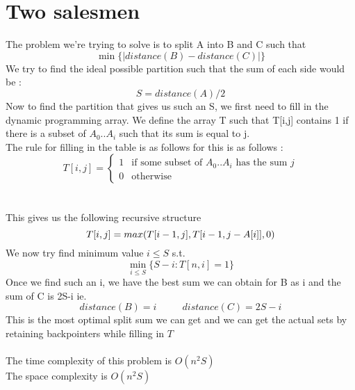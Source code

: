 \documentclass{article}
\begin{document}
    

\section{Two salesmen}
\label{sec:Two salesmen}
    The problem we're trying to solve is to split A into B and C such that
    \[\min \{|distance(B) - distance(C)|\}\]
    We try to find the ideal possible partition such that the sum of each side would be :
    \[S = distance(A)/2\]
    Now to find the partition that gives us such an S, we first need to fill in the dynamic programming array. We define the array T such that T[i,j] contains 1 if there is a subset of $A_0 .. A_i$ such that its sum is equal to j.\\
    The rule for filling in the table is as follows for this is as follows : \\
    \[
    T[i,j] =
    \begin{cases}
        1 &\text{if some subset of }A_0 .. A_i\text{ has the sum }j\\
        0 &\text{otherwise}
    \end{cases}
    \]\\\\
    This gives us the following recursive structure
    \[T[i,j] = max(T[i-1,j], T[i-1, j-A[i]], 0)\\\]
    We now try find minimum value $i \leq S$ s.t.
    \[\min_{i \leq S} \{S - i : T[n, i] = 1\}\]
    Once we find such an i, we have the best sum we can obtain for B as i and the sum of C is 2S-i ie.
    \[distance(B) = i \ \ \ \ \ \ \ \ \ \ \ \ distance(C) = 2S - i\]
    This is the most optimal split sum we can get and we can get the actual sets by retaining backpointers while filling in $T$\\\\
    The time complexity of this problem is $O(n^2S)$\\
    The space complexity is $O(n^2S)$
\end{document}
